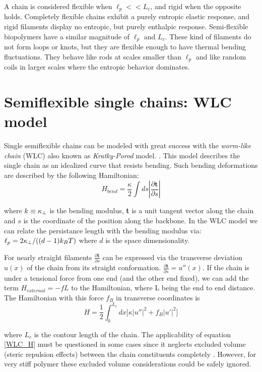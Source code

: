 A chain is considered flexible when $\ell_p<<L_c$, and rigid when the opposite
holds. Completely flexible chains exhibit a purely entropic elastic
response, and rigid filaments display no entropic, but purely enthalpic
response. Semi-flexible biopolymers have a similar magnitude of $\ell_p$ and
$L_c$. These kind of filaments do not form loops or knots, but they are
flexible enough to have thermal bending
fluctuations\citep{storm_nonlinear_2005}. They behave like rods at scales
smaller than $\ell_p$ and like random coils in larger scales where the entropic behavior
dominates.

\section{Semiflexible single chains: WLC model}
Single semiflexible chains can be modeled with great success with the
\emph{worm-like chain} (WLC) also known as \emph{Kratky-Porod} model.
\citep{rubinstein_polymer_2003, schuster_hierarchical_2011}. This model
describes the single chain as an idealized curve that resists bending. Such
bending deformations are described by the following Hamiltonian:
$$H_{bend}=\frac{\kappa}{2} \int ds|\frac{\partial \textbf{t}}{\partial s}|$$

where $k\equiv\kappa_\perp{}$ is the bending modulus, \textbf{t} is a unit tangent
vector along the chain and $s$ is the coordinate of the position along the
backbone. In the WLC model we can relate the persistance length with the bending
modulus via: $\ell_p{}=2\kappa_\perp{}/((d-1)k_B{}T)$ where $d$ is the space
dimensionality.

For nearly straight filaments $\frac{\partial \textbf{t}}{\partial s}$ can be
expressed via the transverse deviation $u(x)$ of the chain from its straight
conformation. $\frac{\partial \textbf{t}}{\partial s}=u''(x)$. If the chain is
under a tensional force from one end (and the other end fixed), we can add the
term $H_{external}=-fL$ to the Hamiltonian, where L being the end to end
distance.
The Hamiltonian with this force $f_B$ in transverse coordinates is
\begin{equation}\label{WLC_H}
H=\frac{1}{2}\int_0^{L_c} dx\Big[\kappa|u''|^2 + f_B|u'|^2\Big]
\end{equation}

where $L_c$ is the contour length of the chain.
The applicability of equation \ref{WLC_H} must be questioned in some cases since
it neglects excluded volume (steric repulsion effects) between the
chain constituents completely \citep{hsu_breakdown_2011}. However, for very stiff
polymer these excluded volume considerations could be safely ignored.

